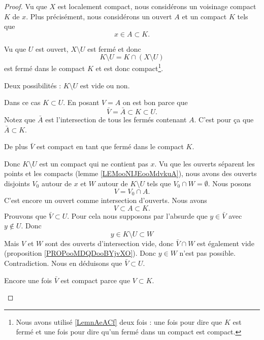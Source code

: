 \begin{proof}
	Vu que \( X\) est localement compact, nous considérons un voisinage compact \( K\) de \( x\). Plus précisément, nous considérons un ouvert \( A\) et un compact \( K\) tels que
	\begin{equation}
		x\in A\subset K.
	\end{equation}

	Vu que \( U\) est ouvert, \( X\setminus U\) est fermé et donc
	\begin{equation}
		K\setminus U=K\cap (X\setminus U)
	\end{equation}
	est fermé dans le compact \( K\) et est donc compact\footnote{Nous avons utilisé \ref{LemnAeACf} deux fois : une fois pour dire que \( K\) est fermé et une fois pour dire qu'un fermé dans un compact est compact.}.

	Deux possibilités : \( K\setminus U\) est vide ou non.
	\begin{subproof}
		\spitem[Si \( K\setminus U=\emptyset\)]
		Dans ce cas \( K\subset U\). En posant \( V=A\) on est bon parce que
		\begin{equation}
			\bar V=\bar A\subset K\subset U.
		\end{equation}
		Notez que \( \bar A\) est l'intersection de tous les fermés contenant \( A\). C'est pour ça que \( \bar A\subset K\).

		De plus \( \bar V\) est compact en tant que fermé dans le compact \( K\).

		Donc \( K\setminus U\) est un compact qui ne contient pas \( x\). Vu que les ouverts séparent les points et les compacts (lemme \ref{LEMooNIJEooMdvkuA}), nous avons des ouverts disjoints \( V_0\) autour de \( x\) et \( W\) autour de \( K\setminus U\) tels que \( V_0\cap W=\emptyset\). Nous posons
		\begin{equation}
			V=V_0\cap A.
		\end{equation}
		C'est encore un ouvert comme intersection d'ouverts. Nous avons
		\begin{equation}
			V\subset A\subset K.
		\end{equation}
		Prouvons que \( \bar V\subset U\). Pour cela nous supposons par l'absurde que \( y\in \bar V\) avec \( y\not\in U\). Donc
		\begin{equation}
			y\in K\setminus U\subset W
		\end{equation}
		Mais \( V\) et \( W\) sont des ouverts d'intersection vide, donc \( \bar V\cap W\) est également vide (proposition \ref{PROPooMDQDooBYjvXO}). Donc \( y\in W\) n'est pas possible. Contradiction. Nous en déduisons que \( \bar V\subset U\).

		Encore une fois \( \bar V\) est compact parce que \( V\subset K\).
	\end{subproof}
\end{proof}

